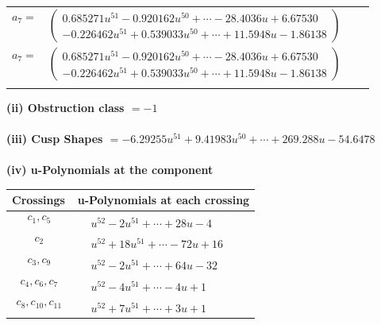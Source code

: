 \documentclass[1p]{elsarticle_modified}
\theoremstyle{definition}
\begin{document}
\begin{tabular}{m{7pt} m{180pt} m{7pt} m{180pt} }
\flushright $a_{7}=$&$\begin{pmatrix}0.685271 u^{51}-0.920162 u^{50}+\cdots-28.4036 u+6.67530\\-0.226462 u^{51}+0.539033 u^{50}+\cdots+11.5948 u-1.86138\end{pmatrix}$\\ \flushright $a_{7}=$&$\begin{pmatrix}0.685271 u^{51}-0.920162 u^{50}+\cdots-28.4036 u+6.67530\\-0.226462 u^{51}+0.539033 u^{50}+\cdots+11.5948 u-1.86138\end{pmatrix}$\\&\end{tabular}
\flushleft \textbf{(ii) Obstruction class $= -1$}\\~\\
\flushleft \textbf{(iii) Cusp Shapes $= -6.29255 u^{51}+9.41983 u^{50}+\cdots+269.288 u-54.6478$}\\~\\
\newpage\renewcommand{\arraystretch}{1}
\flushleft \textbf{(iv) u-Polynomials at the component}\newline \\
\begin{tabular}{m{50pt}|m{274pt}}
Crossings & \hspace{64pt}u-Polynomials at each crossing \\
\hline $$\begin{aligned}c_{1},c_{5}\end{aligned}$$&$\begin{aligned}
&u^{52}-2 u^{51}+\cdots+28 u-4
\end{aligned}$\\
\hline $$\begin{aligned}c_{2}\end{aligned}$$&$\begin{aligned}
&u^{52}+18 u^{51}+\cdots-72 u+16
\end{aligned}$\\
\hline $$\begin{aligned}c_{3},c_{9}\end{aligned}$$&$\begin{aligned}
&u^{52}-2 u^{51}+\cdots+64 u-32
\end{aligned}$\\
\hline $$\begin{aligned}c_{4},c_{6},c_{7}\end{aligned}$$&$\begin{aligned}
&u^{52}-4 u^{51}+\cdots-4 u+1
\end{aligned}$\\
\hline $$\begin{aligned}c_{8},c_{10},c_{11}\end{aligned}$$&$\begin{aligned}
&u^{52}+7 u^{51}+\cdots+3 u+1
\end{aligned}$\\
\hline
\end{tabular}\\~\\
\end{document}
